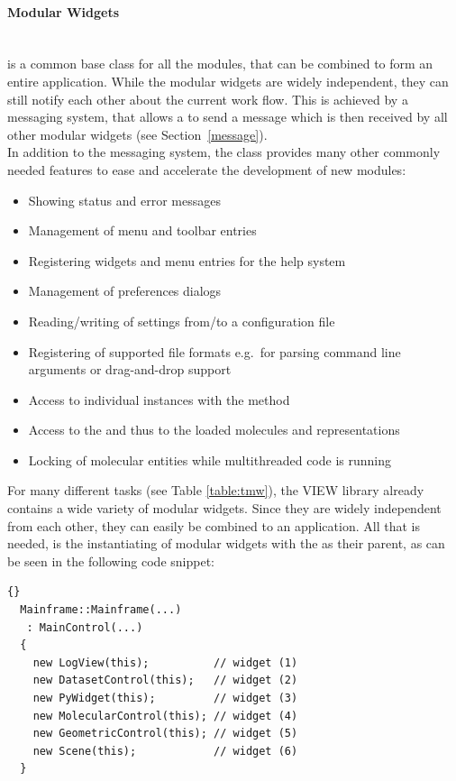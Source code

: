 \paragraph{Modular Widgets}
\hspace*{\fill}\\
 is a common base class for all the modules, that can be
combined to form an entire application. While the modular widgets are widely 
independent, they can still notify each other about the current work flow. 
This is achieved by a messaging system, that allows a 
to send a message which is then received by all other modular widgets (see 
Section~\ref{message}).
\\
In addition to the messaging system, the  class provides 
many other commonly needed features to ease and accelerate the development of
new modules:
\begin{itemize}
\item Showing status and error messages
\item Management of menu and toolbar entries 
\item Registering widgets and menu entries for the help system
\item Management of preferences dialogs
\item Reading/writing of settings from/to a configuration file
\item Registering of supported file formats e.g.\ for parsing command line arguments
or drag-and-drop support
\item Access to individual instances with the method 
\item Access to the  and thus to the loaded molecules and representations
\item Locking of molecular entities while multithreaded code is running
\end{itemize}

For many different tasks (see Table \ref{table:tmw}),
the VIEW library already contains a wide variety of modular widgets.
Since they are widely independent from each other, they can easily
be combined to an application. All that is needed, is the instantiating
of modular widgets with the  as their parent, as can be seen in
the following code snippet:
\begin{lstlisting}{}
  Mainframe::Mainframe(...)
   : MainControl(...)
  {
    new LogView(this);          // widget (1)
    new DatasetControl(this);   // widget (2)
    new PyWidget(this);         // widget (3)
    new MolecularControl(this); // widget (4)
    new GeometricControl(this); // widget (5)
    new Scene(this);            // widget (6)
  }
\end{lstlisting}

